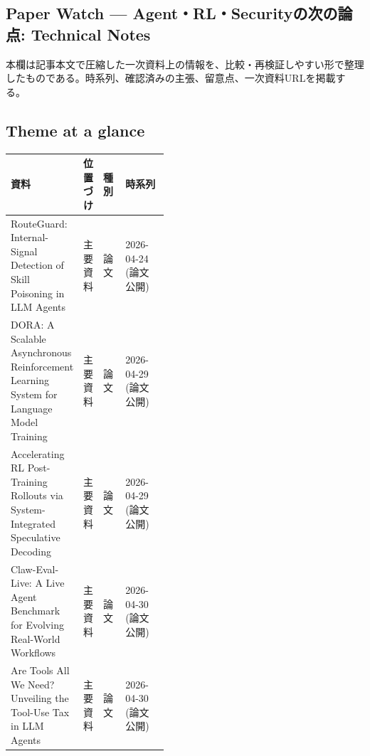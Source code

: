 \subsection*{Paper Watch — Agent・RL・Securityの次の論点: Technical Notes}
本欄は記事本文で圧縮した一次資料上の情報を、比較・再検証しやすい形で整理したものである。時系列、確認済みの主張、留意点、一次資料URLを掲載する。
\medskip
\subsection*{Theme at a glance}
\begin{center}
\footnotesize
\begin{tabularx}{\linewidth}{@{}p{0.20\linewidth}p{0.10\linewidth}p{0.14\linewidth}X@{}}
\toprule
資料 & 位置づけ & 種別 & 時系列 \\
\midrule
RouteGuard: Internal-Signal Detection of Skill Poisoning in LLM Agents & 主要資料 & 論文 & 2026-04-24 (論文公開) \\
DORA: A Scalable Asynchronous Reinforcement Learning System for Language Model Training & 主要資料 & 論文 & 2026-04-29 (論文公開) \\
Accelerating RL Post-Training Rollouts via System-Integrated Speculative Decoding & 主要資料 & 論文 & 2026-04-29 (論文公開) \\
Claw-Eval-Live: A Live Agent Benchmark for Evolving Real-World Workflows & 主要資料 & 論文 & 2026-04-30 (論文公開) \\
Are Tools All We Need? Unveiling the Tool-Use Tax in LLM Agents & 主要資料 & 論文 & 2026-04-30 (論文公開) \\
\bottomrule
\end{tabularx}
\end{center}
\normalsize

